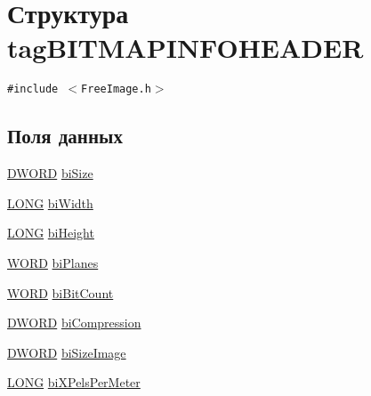\hypertarget{structtag_b_i_t_m_a_p_i_n_f_o_h_e_a_d_e_r}{
\section{Структура tagBITMAPINFOHEADER}
\label{structtag_b_i_t_m_a_p_i_n_f_o_h_e_a_d_e_r}
}
{\tt \#include $<$FreeImage.h$>$}

\subsection*{Поля данных}
\begin{CompactItemize}
\item 
\hyperlink{filtration__run_2free_image_2_free_image_8h_f483253b2143078cede883fc3c111ad2}{DWORD} \hyperlink{structtag_b_i_t_m_a_p_i_n_f_o_h_e_a_d_e_r_78b47f256953606cbf23cd665452a263}{biSize}
\item 
\hyperlink{filtration__run_2free_image_2_free_image_8h_27ec6163192f1e1e72d87421379ea3d4}{LONG} \hyperlink{structtag_b_i_t_m_a_p_i_n_f_o_h_e_a_d_e_r_4bbc605184be98c4da36f707f7695e0f}{biWidth}
\item 
\hyperlink{filtration__run_2free_image_2_free_image_8h_27ec6163192f1e1e72d87421379ea3d4}{LONG} \hyperlink{structtag_b_i_t_m_a_p_i_n_f_o_h_e_a_d_e_r_a18cf290b7f7a6d1cc8058feae85ab68}{biHeight}
\item 
\hyperlink{filtration__run_2free_image_2_free_image_8h_b24077addd3b7b13e086987ff296552c}{WORD} \hyperlink{structtag_b_i_t_m_a_p_i_n_f_o_h_e_a_d_e_r_261e0f0a578bcd4d53a4a221e6ebe2fa}{biPlanes}
\item 
\hyperlink{filtration__run_2free_image_2_free_image_8h_b24077addd3b7b13e086987ff296552c}{WORD} \hyperlink{structtag_b_i_t_m_a_p_i_n_f_o_h_e_a_d_e_r_713c58f9cf7d5f115938d189d59fadf5}{biBitCount}
\item 
\hyperlink{filtration__run_2free_image_2_free_image_8h_f483253b2143078cede883fc3c111ad2}{DWORD} \hyperlink{structtag_b_i_t_m_a_p_i_n_f_o_h_e_a_d_e_r_6b50d93eae77d44af8907740e337583d}{biCompression}
\item 
\hyperlink{filtration__run_2free_image_2_free_image_8h_f483253b2143078cede883fc3c111ad2}{DWORD} \hyperlink{structtag_b_i_t_m_a_p_i_n_f_o_h_e_a_d_e_r_c69dfda61a32d8ec53dd11ef165d198b}{biSizeImage}
\item 
\hyperlink{filtration__run_2free_image_2_free_image_8h_27ec6163192f1e1e72d87421379ea3d4}{LONG} \hyperlink{structtag_b_i_t_m_a_p_i_n_f_o_h_e_a_d_e_r_e363738b6e92248a7be41f4e7ed55c54}{biXPelsPerMeter}

\end{CompactItemize}
